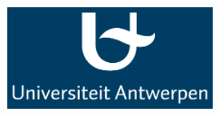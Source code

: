 
\begin{titlepage}

\begin{addmargin}[-1cm]{-3cm}
\begin{center}
\large

\hfill
\vfill

\begingroup
\color{Maroon}\spacedallcaps{\myTitle} \\ \bigskip %
\endgroup


\vfill

\includegraphics[width=6cm]{gfx/logo_UA_vert1_wit.jpg} \\ \medskip %

\mySubtitle \\ \medskip %
\myDegree{} \\
\myDepartment{} \\
\myFaculty{} \\
\myUni \\ \bigskip

\myTime

\myProf{}\\
\myOtherProf{}\\
\mySupervisor{}\\
\vfill

\end{center}
\end{addmargin}

\end{titlepage}
